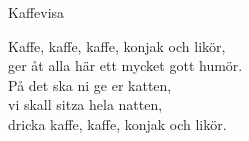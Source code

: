 \begin{song}{Kaffevisa}
	
	
	
	Kaffe, kaffe, kaffe, konjak och likör,\\
	ger åt alla här ett mycket gott humör.\\
	På det ska ni ge er katten,\\
	vi skall sitza hela natten,\\
	dricka kaffe, kaffe, konjak och likör.
	
\end{song}
